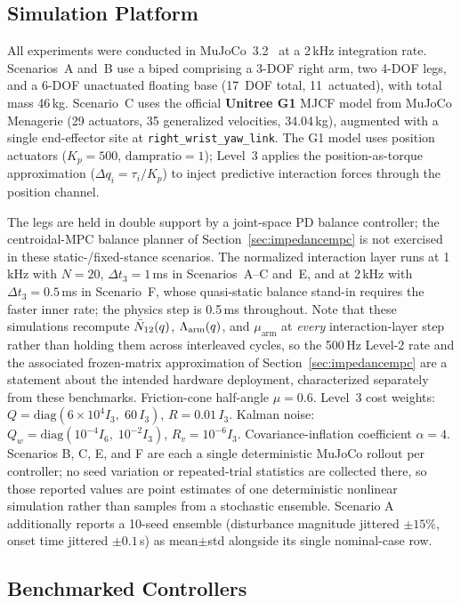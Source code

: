 \subsection{Simulation Platform}

All experiments were conducted in MuJoCo~3.2~\cite{todorov2012mujoco} at a
2\,kHz integration rate.
Scenarios~A and~B use a biped comprising a 3-DOF right arm, two 4-DOF legs,
and a 6-DOF unactuated floating base (17~DOF total, 11~actuated), with
total mass 46\,kg.
Scenario~C uses the official \textbf{Unitree G1} MJCF model from MuJoCo
Menagerie (29 actuators, 35 generalized velocities, 34.04\,kg), augmented with a
single end-effector site at \texttt{right\_wrist\_yaw\_link}.
The G1 model uses position actuators ($K_p=500$, $\text{dampratio}=1$);
Level~3 applies the position-as-torque approximation
($\Delta q_i=\tau_i/K_p$) to inject predictive interaction forces through the
position channel.

The legs are held in double support by a joint-space PD balance controller;
the centroidal-MPC balance planner of Section~\ref{sec:impedancempc} is not
exercised in these static-/fixed-stance scenarios. The normalized interaction
layer runs at 1\,kHz with $N=20$, $\Delta t_3=1$\,ms in Scenarios~A--C and~E,
and at 2\,kHz with $\Delta t_3=0.5$\,ms in Scenario~F, whose quasi-static
balance stand-in requires the faster inner rate; the physics step is 0.5\,ms
throughout. Note that these simulations recompute $\bar{N}_{12}(q)$, $\Lambda_{\text{arm}}(q)$, and
$\mu_{\text{arm}}$ at \emph{every} interaction-layer step rather than holding
them across interleaved cycles, so the 500\,Hz Level-2 rate and the associated
frozen-matrix approximation of Section~\ref{sec:impedancempc} are a statement
about the intended hardware deployment, characterized separately from
these benchmarks.
Friction-cone half-angle $\mu=0.6$.
Level~3 cost weights: $Q=\mathrm{diag}(6\times10^4 I_3,\;60\,I_3)$,
$R=0.01\,I_3$.
Kalman noise: $Q_w=\mathrm{diag}(10^{-4}I_6,\;10^{-2}I_3)$,
$R_v=10^{-6}I_3$.
Covariance-inflation coefficient $\alpha=4$. Scenarios B, C, E, and F are
each a single deterministic MuJoCo rollout per controller; no seed variation
or repeated-trial statistics are collected there, so those reported values
are point estimates of one deterministic nonlinear simulation rather than
samples from a stochastic ensemble. Scenario A additionally reports a
10-seed ensemble (disturbance magnitude jittered $\pm15\%$, onset time
jittered $\pm0.1$\,s) as mean$\pm$std alongside its single nominal-case row.

\subsection{Benchmarked Controllers}

